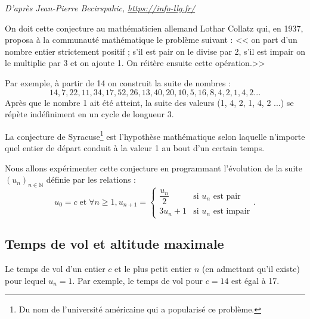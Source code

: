 
\begin{flushright}
\textit{D'après Jean-Pierre Becirspahic, \url{https://info-llg.fr/}}
\end{flushright}


On doit cette conjecture au mathématicien allemand Lothar Collatz qui, en 1937, proposa à la communauté mathématique
le problème suivant : << on part d’un nombre entier strictement positif ; s’il est pair on le divise par 2, s’il est impair on le multiplie par 3 et on ajoute 1. On réitère ensuite cette opération.>>

Par exemple, à partir de 14 on construit la suite de nombres :
$$14 ,7 ,22 ,11 ,34, 17, 52, 26, 13, 40, 20, 10, 5, 16, 8, 4, 2, 1, 4, 2 ...$$
Après que le nombre 1 ait été atteint, la suite des valeurs (1, 4, 2, 1, 4, 2 ...) se répète indéfiniment en un cycle de
longueur 3.

La conjecture de Syracuse\footnote{Du nom de l’université américaine qui a popularisé ce problème.} est l’hypothèse mathématique selon laquelle n’importe quel entier de départ conduit à la valeur 1 au bout d’un certain temps.

Nous allons expérimenter cette conjecture en programmant l’évolution de la suite $\left(u_n\right)_{n\in \mathbb{N}}$ définie par les relations :
$$
u_0=c \;\text{et} \; \forall n\geq 1, u_{n+1}=\left\{
\begin{array}{ll} 
\dfrac{u_n}{2} & \text{si }u_n \text{ est pair}\\
3 u_n + 1  & \text{si }u_n \text{ est impair}
\end{array} \right. .
$$

\subsection*{Temps de vol et altitude maximale}
Le temps de vol d’un entier $c$ et le plus petit entier $n$ (en admettant qu’il existe) pour lequel $u_n = 1$. Par exemple, le temps de vol pour $c = 14$ est égal à 17.


